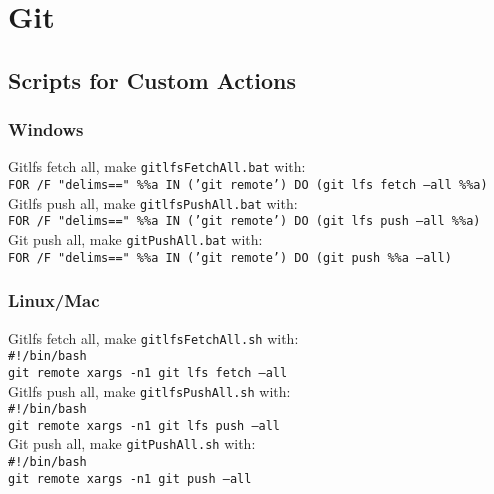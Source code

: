 \documentclass[11pt,spacing=single]{article}
\begin{document}
	\section{Git}
		\subsection*{Scripts for Custom Actions}
			\subsubsection*{Windows}
				Gitlfs fetch all, make \texttt{gitlfsFetchAll.bat} with:\\
				\texttt{FOR /F "delims==" \%\%a IN ('git remote') DO (git lfs fetch --all \%\%a)}\\

				\noindent
				Gitlfs push all, make \texttt{gitlfsPushAll.bat} with:\\
				\texttt{FOR /F "delims==" \%\%a IN ('git remote') DO (git lfs push --all \%\%a)}\\

				\noindent
				Git push all, make \texttt{gitPushAll.bat} with:\\
				\texttt{FOR /F "delims==" \%\%a IN ('git remote') DO (git push \%\%a --all)}

			\subsubsection*{Linux/Mac}
				Gitlfs fetch all, make \texttt{gitlfsFetchAll.sh} with:\\
				\texttt{\#!/bin/bash\\ git remote \textbar xargs -n1 git lfs fetch --all}\\

				\noindent
				Gitlfs push all, make \texttt{gitlfsPushAll.sh} with:\\
				\texttt{\#!/bin/bash\\ git remote \textbar xargs -n1 git lfs push --all}\\

				\noindent
				Git push all, make \texttt{gitPushAll.sh} with:\\
				\texttt{\#!/bin/bash\\ git remote \textbar xargs -n1 git push --all}

	\newpage
	
\end{document}
